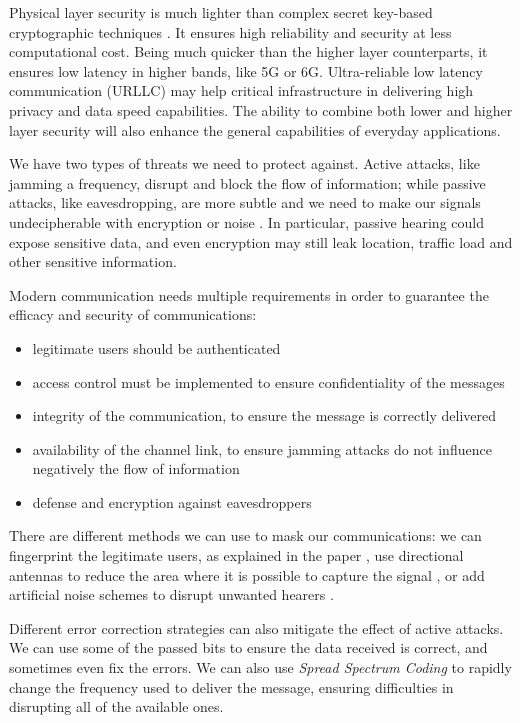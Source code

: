 Physical layer security is much lighter than complex secret key-based cryptographic techniques \cite{10599431}. It ensures high reliability and security at less computational cost. Being much quicker than the higher layer counterparts, it ensures low latency in higher bands, like 5G or 6G. Ultra-reliable low latency communication (URLLC) may help critical infrastructure in delivering high privacy and data speed capabilities. The ability to combine both lower and higher layer security will also enhance the general capabilities of everyday applications.

We have two types of threats we need to protect against. Active attacks, like jamming a frequency, disrupt and block the flow of information; while passive attacks, like eavesdropping, are more subtle and we need to make our signals undecipherable with encryption or noise \cite{5751298}. In particular, passive hearing could expose sensitive data, and even encryption may still leak location, traffic load and other sensitive information.

Modern communication needs multiple requirements in order to guarantee the efficacy and security of communications:
\begin{itemize}
  \item legitimate users should be authenticated
  \item access control must be implemented to ensure confidentiality of the messages
  \item integrity of the communication, to ensure the message is correctly delivered
  \item availability of the channel link, to ensure jamming attacks do not influence negatively the flow of information
  \item defense and encryption against eavesdroppers
\end{itemize}

There are different methods we can use to mask our communications: we can fingerprint the legitimate users, as explained in the paper \cite{228fe14543ce4cefba3bb9cc11741362}, use directional antennas to reduce the area where it is possible to capture the signal \cite{4543070}, or add artificial noise schemes to disrupt unwanted hearers \cite{1605889}.

Different error correction strategies can also mitigate the effect of active attacks. We can use some of the passed bits to ensure the data received is correct, and sometimes even fix the errors. We can also use \textit{Spread Spectrum Coding} to rapidly change the frequency used to deliver the message, ensuring difficulties in disrupting all of the available ones.

